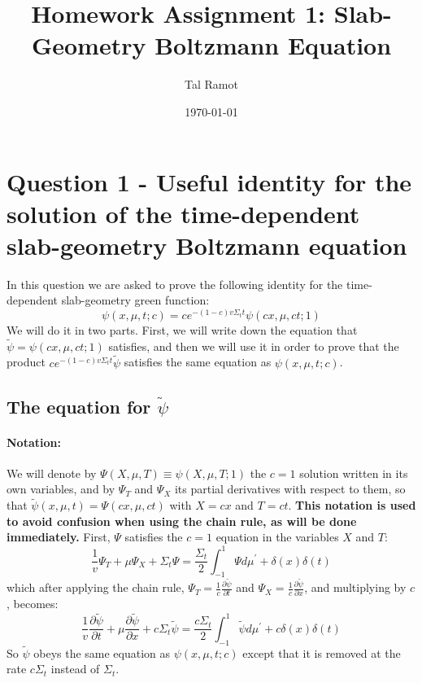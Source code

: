\documentclass[11pt]{article}
\title{Homework Assignment 1: Slab-Geometry Boltzmann Equation}
\author{Tal Ramot}
\date{\today}
\begin{document}
\maketitle
\section*{Question 1 - Useful identity for the solution of the time-dependent slab-geometry Boltzmann equation}
In this question we are asked to prove the following identity for the time-dependent slab-geometry green function:
\begin{equation}
    \psi(x,\mu,t;c) = ce^{-(1-c){v\Sigma_t} t}\psi(cx,\mu,ct;1) \label{eq:identity}
\end{equation}
We will do it in two parts. First, we will write down the equation that $\tilde{\psi} = \psi(cx,\mu,ct;1)$ satisfies, and then we will use it in order to prove that the product $ce^{-(1-c){v\Sigma_t} t}\tilde{\psi}$ satisfies the same equation as $\psi(x,\mu,t;c)$.
\subsection*{The equation for $\tilde{\psi}$}
\paragraph{Notation:} We will denote by $\Psi(X,\mu,T)\equiv\psi(X,\mu,T;1)$ the $c=1$ solution written in its own variables, and by $\Psi_T$ and $\Psi_X$ its partial derivatives with respect to them, so that $\tilde{\psi}(x,\mu,t) = \Psi(cx,\mu,ct)$ with $X=cx$ and $T=ct$. \textbf{This notation is used to avoid confusion when using the chain rule, as will be done immediately.}
First, $\Psi$ satisfies the $c=1$ equation in the variables $X$ and $T$:
\begin{equation}
    \frac{1}{v}\Psi_T + \mu \Psi_X + \Sigma_t \Psi = \frac{\Sigma_t}{2}\int_{-1}^{1} \Psi d\mu^\prime + \delta(x)\delta(t)
\end{equation}
which after applying the chain rule, $\Psi_T = \frac{1}{c}\frac{\partial \tilde{\psi}}{\partial t}$ and $\Psi_X = \frac{1}{c}\frac{\partial \tilde{\psi}}{\partial x}$, and multiplying by $c$, becomes:
\begin{equation}
    \frac{1}{v}\frac{\partial \tilde{\psi}}{\partial t} + \mu \frac{\partial \tilde{\psi}}{\partial x} + c\Sigma_t \tilde{\psi} = \frac{c\Sigma_t}{2}\int_{-1}^{1} \tilde{\psi}d\mu^\prime \label{eq:tilde} + c\delta(x)\delta(t)
\end{equation}
So $\tilde{\psi}$ obeys the same equation as $\psi(x,\mu,t;c)$ except that it is removed at the rate $c\Sigma_t$ instead of $\Sigma_t$.
\end{document}
